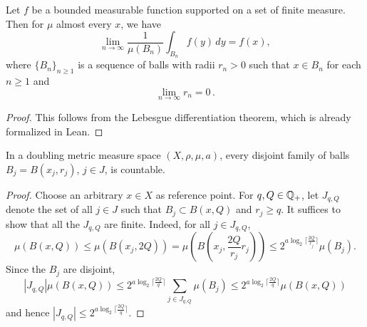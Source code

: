 \begin{lemma}
    \label{Lebesgue-differentiation}
    \leanok
    Let $f$ be a bounded measurable function supported on a set of finite measure. Then for $\mu$ almost every $x$, we have
    $$\lim_{n\to \infty} \frac{1}{\mu(B_n)}\int_{B_n} f(y)\, dy= f(x),$$
    where $\{B_n\}_{n\geq 1}$ is a sequence of balls with radii $r_n>0$ such that $x\in B_n$ for each $n\geq 1$ and
    \begin{equation*}
        \lim_{n\to \infty} r_n=0 \,.
    \end{equation*}
\end{lemma}
\begin{proof}
    \leanok
    This follows from the Lebesgue differentiation theorem, which is already formalized in Lean.
\end{proof}

\begin{lemma}
    \leanok
    \label{disjoint-family-countable}
    In a doubling metric measure space $(X,\rho,\mu, a)$, every disjoint family of balls $B_j = B(x_j, r_j)$, $j\in J$, is countable.
\end{lemma}
\begin{proof}
    \leanok
    Choose an arbitrary $x\in X$ as reference point. For $q, Q\in{\mathbb{Q}}_+$, let $J_{q,Q}$ denote the set of all $j\in J$ such that $B_j\subset B(x, Q)$ and $r_j \ge q$. It suffices to show that all the $J_{q,Q}$ are finite.
    Indeed, for all $j\in J_{q,Q}$,
    \begin{equation*}
        \mu(B(x, Q)) \le \mu(B(x_j, 2Q)) = \mu(B(x_j, \frac{2 Q}{r_j} r_j))
        \le 2^{a\log_2{\lceil \frac{2 Q}{r_j}\rceil}} \mu(B_j).
    \end{equation*}
    Since the $B_j$ are disjoint,
    \begin{equation}
        |J_{q,Q}| \mu(B(x, Q)) \le 2^{a\log_2{\lceil\frac{2Q}{q}\rceil}} \sum_{j\in J_{q,Q}} \mu(B_j) \le 2^{a\log_2{\lceil\frac{2Q}{q}\rceil}} \mu(B(x,Q))
    \end{equation}
    and hence $|J_{q,Q}| \le 2^{a\log_2{\lceil\frac{2Q}{q}\rceil}}$.
\end{proof}

